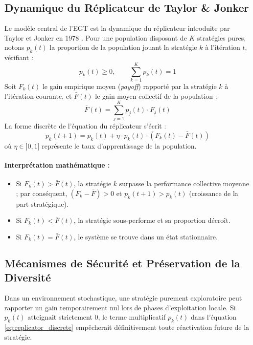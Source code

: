 \subsection{Dynamique du Réplicateur de Taylor \& Jonker}
Le modèle central de l'EGT est la dynamique du réplicateur introduite par Taylor et Jonker en 1978 \cite{taylor1978evolutionary}. Pour une population disposant de $K$ stratégies pures, notons $p_k(t)$ la proportion de la population jouant la stratégie $k$ à l'itération $t$, vérifiant :
\begin{equation}
    p_k(t) \ge 0, \qquad \sum_{k=1}^K p_k(t) = 1
\end{equation}
Soit $F_k(t)$ le gain empirique moyen (\textit{payoff}) rapporté par la stratégie $k$ à l'itération courante, et $\bar{F}(t)$ le gain moyen collectif de la population :
\begin{equation}
    \bar{F}(t) = \sum_{j=1}^K p_j(t) \cdot F_j(t)
\end{equation}
La forme discrète de l'équation du réplicateur s'écrit :
\begin{equation}
    p_k(t+1) = p_k(t) + \eta \cdot p_k(t) \cdot \left(F_k(t) - \bar{F}(t)\right)
    \label{eq:replicator_discrete}
\end{equation}
où $\eta \in ]0, 1]$ représente le taux d'apprentissage de la population.

\paragraph{Interprétation mathématique :}
\begin{itemize}[label=\textbullet]
    \item Si $F_k(t) > \bar{F}(t)$, la stratégie $k$ surpasse la performance collective moyenne ; par conséquent, $(F_k - \bar{F}) > 0$ et $p_k(t+1) > p_k(t)$ (croissance de la part stratégique).
    \item Si $F_k(t) < \bar{F}(t)$, la stratégie sous-performe et sa proportion décroît.
    \item Si $F_k(t) = \bar{F}(t)$, le système se trouve dans un état stationnaire.
\end{itemize}

\subsection{Mécanismes de Sécurité et Préservation de la Diversité}
Dans un environnement stochastique, une stratégie purement exploratoire peut rapporter un gain temporairement nul lors de phases d'exploitation locale. Si $p_k(t)$ atteignait strictement 0, le terme multiplicatif $p_k(t)$ dans l'équation \eqref{eq:replicator_discrete} empêcherait définitivement toute réactivation future de la stratégie.

